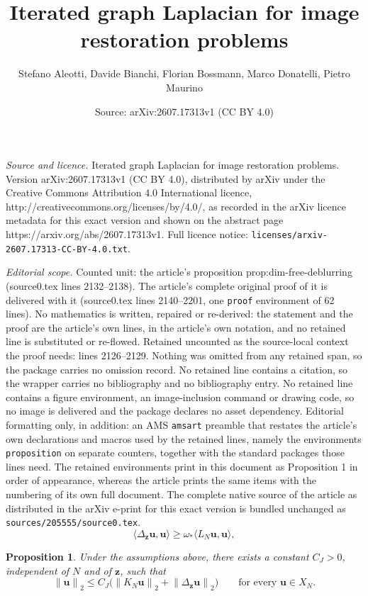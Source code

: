 \documentclass[10pt,a4paper]{amsart}
\title{Iterated graph Laplacian for image restoration problems}
\author{Stefano Aleotti, Davide Bianchi, Florian Bossmann, Marco Donatelli, Pietro Maurino}
\date{Source: arXiv:2607.17313v1 (CC BY 4.0)}
\newtheorem{proposition}{Proposition}
\newcommand{\bu}{{\bm{u}}}
\newcommand{\bz}{{\bm{z}}}
\newcommand{\norm}[1]{\left\lVert #1 \right\rVert}
\begin{document}
\maketitle

\noindent\emph{Source and licence.} Iterated graph Laplacian for image restoration problems. Version arXiv:2607.17313v1 (CC BY 4.0), distributed by arXiv under the Creative Commons Attribution 4.0 International licence, http://creativecommons.org/licenses/by/4.0/, as recorded in the arXiv licence metadata for this exact version and shown on the abstract page https://arxiv.org/abs/2607.17313v1. Full licence notice: \texttt{licenses/arxiv-2607.17313-CC-BY-4.0.txt}.\par\smallskip

\noindent\textit{Editorial scope.} Counted unit: the article's proposition prop:dim-free-deblurring (source0.tex lines 2132--2138). The article's complete original proof of it is delivered with it (source0.tex lines 2140--2201, one \texttt{proof} environment of 62 lines). No mathematics is written, repaired or re-derived: the statement and the proof are the article's own lines, in the article's own notation, and no retained line is substituted or re-flowed.  Retained uncounted as the source-local context the proof needs: lines 2126--2129.  Nothing was omitted from any retained span, so the package carries no omission record.  No retained line contains a citation, so the wrapper carries no bibliography and no bibliography entry.  No retained line contains a figure environment, an image-inclusion command or drawing code, so no image is delivered and the package declares no asset dependency.  Editorial formatting only, in addition: an AMS \texttt{amsart} preamble that restates the article's own declarations and macros used by the retained lines, namely the environments \texttt{proposition} on separate counters, together with the standard packages those lines need.  The retained environments print in this document as Proposition 1 in order of appearance, whereas the article prints the same items with the numbering of its own full document.  The complete native source of the article as distributed in the arXiv e-print for this exact version is bundled unchanged as \texttt{sources/205555/source0.tex}.
\begin{equation}\label{eq:graph-form-comparison}
\langle \Delta_\bz\bu,\bu\rangle
\ge \omega_*\langle L_N\bu,\bu\rangle,
\end{equation}

\begin{proposition}\label{prop:dim-free-deblurring}
Under the assumptions above, there exists a constant $C_J>0$, independent of $N$ and of $\bz$, such that
\[
\norm{\bu}_2\le C_J\bigl(\norm{K_N\bu}_2+\norm{\Delta_\bz\bu}_2\bigr)
\qquad\text{for every }\bu\in X_N.
\]
\end{proposition}
\end{document}
